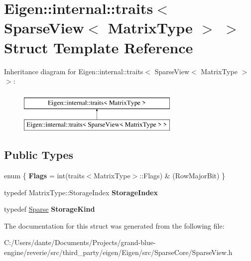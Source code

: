 \hypertarget{struct_eigen_1_1internal_1_1traits_3_01_sparse_view_3_01_matrix_type_01_4_01_4}{}\section{Eigen\+::internal\+::traits$<$ Sparse\+View$<$ Matrix\+Type $>$ $>$ Struct Template Reference}
\label{struct_eigen_1_1internal_1_1traits_3_01_sparse_view_3_01_matrix_type_01_4_01_4}
Inheritance diagram for Eigen\+::internal\+::traits$<$ Sparse\+View$<$ Matrix\+Type $>$ $>$\+:\begin{figure}[H]
\begin{center}
\leavevmode
\includegraphics[height=2.000000cm]{struct_eigen_1_1internal_1_1traits_3_01_sparse_view_3_01_matrix_type_01_4_01_4}
\end{center}
\end{figure}
\subsection*{Public Types}
\begin{DoxyCompactItemize}
\item 
\mbox{\label{struct_eigen_1_1internal_1_1traits_3_01_sparse_view_3_01_matrix_type_01_4_01_4_affef1d269cc13d0338b38af939bd614c}} 
enum \{ {\bfseries Flags} = int(traits$<$Matrix\+Type$>$\+::Flags) \& (Row\+Major\+Bit)
 \}
\item 
\mbox{\label{struct_eigen_1_1internal_1_1traits_3_01_sparse_view_3_01_matrix_type_01_4_01_4_ac67f7bf924419706f1708c0873101105}} 
typedef Matrix\+Type\+::\+Storage\+Index {\bfseries Storage\+Index}
\item 
\mbox{\label{struct_eigen_1_1internal_1_1traits_3_01_sparse_view_3_01_matrix_type_01_4_01_4_afe350cae0f466205c82b0bce14cf2ff5}} 
typedef \mbox{\hyperlink{struct_eigen_1_1_sparse}{Sparse}} {\bfseries Storage\+Kind}
\end{DoxyCompactItemize}


The documentation for this struct was generated from the following file\+:\begin{DoxyCompactItemize}
\item 
C\+:/\+Users/dante/\+Documents/\+Projects/grand-\/blue-\/engine/reverie/src/third\+\_\+party/eigen/\+Eigen/src/\+Sparse\+Core/Sparse\+View.\+h\end{DoxyCompactItemize}
